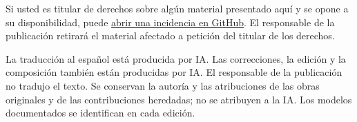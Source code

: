 \documentclass[10pt,oneside]{book}
\begin{document}
Si usted es titular de derechos sobre algún material presentado aquí y se opone a su disponibilidad, puede \href{https://github.com/KokunoYumeto/ega-fga-es/issues}{abrir una incidencia en GitHub}. El responsable de la publicación retirará el material afectado a petición del titular de los derechos.

La traducción al español está producida por IA. Las correcciones, la edición y la composición también están producidas por IA. El responsable de la publicación no tradujo el texto. Se conservan la autoría y las atribuciones de las obras originales y de las contribuciones heredadas; no se atribuyen a la IA. Los modelos documentados se identifican en cada edición.
\par
\endgroup
\clearpage












\end{document}
